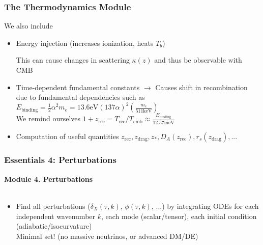 \begin{frame}[fragile]
	\frametitle{The Thermodynamics Module}

	We also include
	\begin{itemize}
		\item Energy injection (increases ionization, heats $T_b$)

		This can cause changes in scattering $\kappa(z)$ and thus be observable with CMB
		\item Time-dependent fundamental constants $\to$ Causes shift in recombination due to fundamental dependencies such as $E_\mathrm{binding} = \frac{1}{2}\alpha^2 m_e= 13.6\mathrm{eV} \left(137 \alpha\right)^2 \left(\frac{m_e}{511\mathrm{keV}}\right)$
		\\
		We remind ourselves $1+z_\mathrm{rec} = T_\mathrm{rec}/T_\mathrm{cmb} \approx \frac{E_\mathrm{binding}}{12.57\mathrm{meV}}$
		\item Computation of useful quantities $z_\mathrm{rec}, z_\mathrm{drag}, z_*, D_A(z_\mathrm{rec}), r_s(z_\mathrm{drag}), ...$
	\end{itemize}
\end{frame}



\begin{frame}[fragile]
	\frametitle{Essentials 4: Perturbations}
	
	{\bf Module 4. Perturbations}\\
	\mbox{}\\
	\begin{itemize}
		\item
		Find all perturbations ($\delta_X(\tau,k)$, $\phi(\tau,k)$, ...)  by integrating ODEs for each independent wavenumber $k$, each mode (scalar/tensor), each initial condition (adiabatic/isocurvature)\\
		{\Red Minimal set!} (no massive neutrinos, or advanced DM/DE)
	\end{itemize}
\end{frame}



